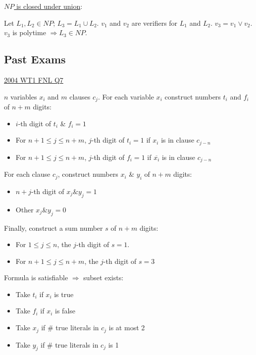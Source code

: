 \documentclass[10pt,landscape,a4paper]{article}
\begin{document}
\begin{multicols*}{3}
\underline{$NP$ is closed under union}:

Let $L_1, L_2 \in NP$; $L_3 = L_1 \cup L_2$. $v_1$ and $v_2$ are verifiers for $L_1$ and $L_2$. $v_3 = v_1 \vee v_2$. $v_3$ is polytime $\Rightarrow L_3 \in NP$.




\subsection{Past Exams}

\underline{2004 WT1 FNL Q7}

$n$ variables $x_i$ and $m$ clauses $c_j$. For each variable $x_i$ construct numbers $t_i$ and $f_i$ of $n + m$ digits:

\begin{itemize}
    \item $i$-th digit of $t_i$ \& $f_i = 1$
    \item For $n + 1 \leq j \leq n + m$, $j$-th digit of $t_i = 1$ if $x_i$ is in clause $c_{j-n}$
    \item For $n + 1 \leq j \leq n + m$, $j$-th digit of $f_i = 1$ if $\overline{x_i}$ is in clause $c_{j-n}$
\end{itemize}

For each clause $c_j$, construct numbers $x_i$ \& $y_i$ of $n + m$ digits:

\begin{itemize}
    \item $n+j$-th digit of $x_j \& y_j = 1$
    \item Other $x_j \& y_j = 0$
\end{itemize}

Finally, construct a sum number $s$ of $n + m$ digits:

\begin{itemize}
    \item For $1 \leq j \leq n$, the $j$-th digit of $s = 1$.
    \item For $n + 1 \leq j \leq n + m$, the $j$-th digit of $s = 3$
\end{itemize}

Formula is satisfiable $\Rightarrow$ subset exists:

\begin{itemize}
    \item Take $t_i$ if $x_i$ is true
    \item Take $f_i$ if $x_i$ is false
    \item Take $x_j$ if \# true literals in $c_j$ is at most 2
    \item Take $y_j$ if \# true literals in $c_j$ is 1
\end{itemize}


\end{multicols*}
\end{document}
